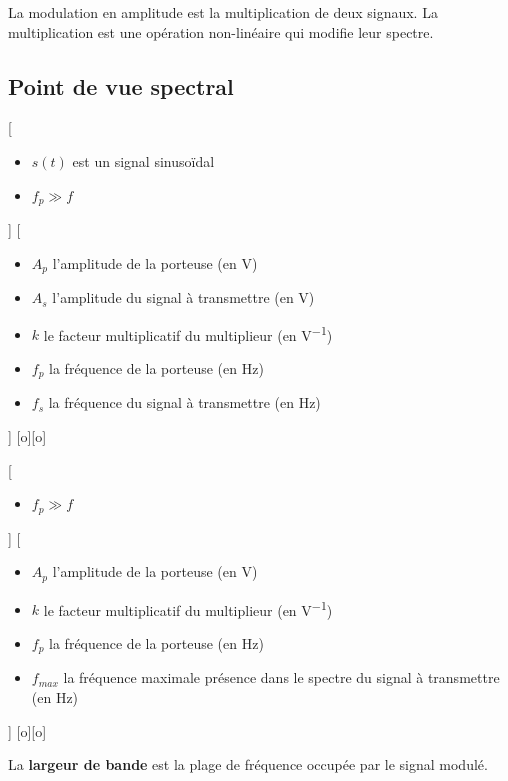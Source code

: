 La modulation en amplitude est la multiplication de deux signaux. La multiplication est une opération non-linéaire qui modifie leur spectre.

\subsection{Point de vue spectral}

[
  \begin{itemize}
    \item $s(t)$ est un signal sinusoïdal
    \item $f_p \gg f$
  \end{itemize}
]
{\schema{}{4cm}}
[
  \begin{itemize}
    \item $A_p$ l'amplitude de la porteuse (en \unit{V})
    \item $A_s$ l'amplitude du signal à transmettre (en \unit{V})
    \item $k$ le facteur multiplicatif du multiplieur (en \unit{V^{-1}})
    \item $f_p$ la fréquence de la porteuse (en \unit{Hz})
    \item $f_s$ la fréquence du signal à transmettre (en \unit{Hz})
  \end{itemize}
]
[o][o]

[
  \begin{itemize}
    \item $f_p \gg f$
  \end{itemize}
]
{\schema{}{4cm}}
[
  \begin{itemize}
    \item $A_p$ l'amplitude de la porteuse (en \unit{V})
    \item $k$ le facteur multiplicatif du multiplieur (en \unit{V^{-1}})
    \item $f_p$ la fréquence de la porteuse (en \unit{Hz})
    \item $f_{max}$ la fréquence maximale présence dans le spectre du signal à transmettre (en \unit{Hz})
  \end{itemize}
]
[o][o]


La \textbf{largeur de bande} est la plage de fréquence occupée par le signal modulé.



